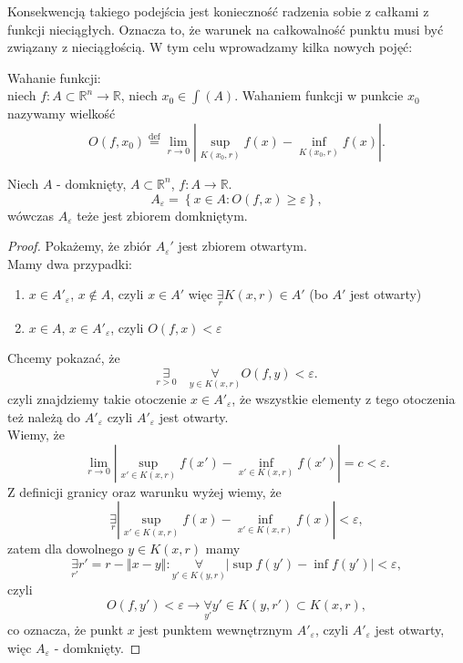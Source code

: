 \documentclass[../main.tex]{subfiles}
\begin{document}
Konsekwencją takiego podejścia jest konieczność radzenia sobie z całkami z funkcji nieciągłych. Oznacza to, że warunek na całkowalność punktu musi być związany z nieciągłością. W tym celu wprowadzamy kilka nowych pojęć:
\begin{definicja}
    Wahanie funkcji:\\
    niech $f: A\subset \mathbb{R}^n\to \mathbb{R}$, niech $x_0\in \int(A)$. Wahaniem funkcji w punkcie $x_0$ nazywamy wielkość
    \[
        O(f,x_0) \overset{\text{def}}{=} \lim_{r\to 0} \left| \sup_{K(x_0, r)}f(x) - \inf_{K(x_0, r)}f(x) \right|
    .\]
\end{definicja}
\begin{stw}
    Niech $A$ - domknięty, $A\subset \mathbb{R}^n$, $f: A\to \mathbb{R}$.\\
    \[
        A_\varepsilon = \left\{ x\in A: O(f, x) \ge \varepsilon \right\}
    ,\]
wówczas $A_\varepsilon$ teże jest zbiorem domkniętym.
\end{stw}
\begin{proof}
    Pokażemy, że zbiór $A_\varepsilon'$ jest zbiorem otwartym.\\
    Mamy dwa przypadki:
    \begin{enumerate}
        \item $x\in A'_\varepsilon$, $x\not\in A$, czyli $x\in A'$ więc $\underset{r}{\exists} K(x,r)\in A'$ (bo $A'$ jest otwarty)
        \item $x\in A$, $x\in A'_\varepsilon$, czyli $O(f,x) < \varepsilon$
    \end{enumerate}
    Chcemy pokazać, że
    \[
        \underset{r>0}{\exists} \quad \underset{y\in K(x,r)}{\forall} O(f,y) < \varepsilon
    .\]
czyli znajdziemy takie otoczenie $x\in A'_\varepsilon$, że wszystkie elementy z tego otoczenia też należą do $A'_\varepsilon$ czyli $A'_\varepsilon$ jest otwarty.\\
Wiemy, że
\[
    \lim_{r\to 0} \left| \sup_{x'\in K(x,r)}f(x') - \inf_{x'\in K(x,r)}f(x') \right| = c < \varepsilon
.\]
Z definicji granicy oraz warunku wyżej wiemy, że
\[
    \underset{r}{\exists} \left| \sup_{x'\in K(x,r)}f(x) - \inf_{x'\in K(x,r)}f(x) \right| < \varepsilon
,\]
zatem dla dowolnego $y\in K(x,r)$ mamy
 \[
     \underset{r'}{\exists} r' = r- \left\Vert x - y \right\Vert: \underset{y'\in K(y,r)}{\forall} \left| \sup f(y') - \inf f(y') \right| < \varepsilon
,\]
czyli
\[
    O(f,y') < \varepsilon \to \underset{y'}{\forall} y'\in K(y, r')\subset K(x,r)
,\]
co oznacza, że punkt $x$ jest punktem wewnętrznym $A'_\varepsilon$, czyli $A'_\varepsilon$ jest otwarty, więc $A_\varepsilon$ - domknięty.
\end{proof}
\end{document}

